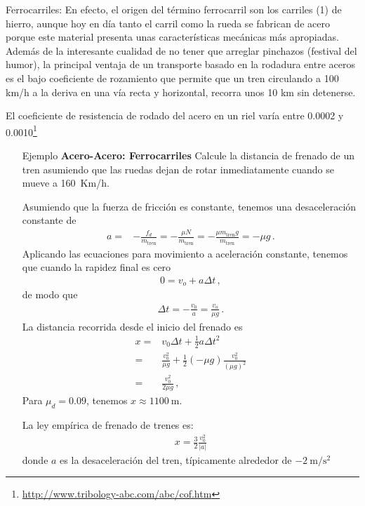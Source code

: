 \begin{frame}
  \begin{block}%
{Ferrocarriles:} En efecto, el origen del término ferrocarril son los carriles (1) de hierro, aunque hoy en día tanto el carril como la rueda se fabrican de acero porque este material presenta unas características mecánicas más apropiadas. Además de la interesante cualidad de no tener que arreglar pinchazos (festival del humor), la principal ventaja de un transporte basado en la rodadura entre aceros es el bajo coeficiente de rozamiento que permite que un tren circulando a 100 km/h a la deriva en una vía recta y horizontal, recorra unos 10 km sin detenerse. 
  \end{block}
El coeficiente de resistencia de rodado del acero en un riel varía entre 0.0002 y 0.0010\footnote{\url{http://www.tribology-abc.com/abc/cof.htm}} 
\end{frame}



\begin{itemize}
\item[Ejemplo] \textbf{Acero-Acero: Ferrocarriles} Calcule la distancia de frenado de un tren asumiendo que las ruedas dejan de rotar inmediatamente cuando se mueve a 160~Km/h.

Asumiendo que la fuerza de fricción es constante, tenemos una desaceleración constante de
\begin{align}
  a=&-\frac{f_d}{m_{\text{tren}}}=-\frac{\mu N}{m_{\text{tren}}}=-\frac{\mu m_{\text{tren}} g}{m_{\text{tren}}}=
-\mu g\,.
\end{align}
Aplicando las ecuaciones para movimiento a aceleración constante, tenemos que cuando la rapidez final es cero
\begin{align}
  0=v_o+a\Delta t\,,
\end{align}
de modo que
\begin{align}
  \Delta t = -\frac{v_0}{a}=\frac{v_o}{\mu g}\,.
\end{align}
La distancia recorrida desde el inicio del frenado es
\begin{align}
  x=&v_0 \Delta t +\frac{1}{2}a \Delta t^2\nonumber\\
  =&\frac{v_0^2}{\mu g}+\frac{1}{2}(-\mu g)\frac{v_0^2}{(\mu g)^2}\nonumber\\
 =&\frac{v_0^2}{2\mu g}\,,
\end{align}
Para $\mu_d=0.09$, tenemos $x\approx 1100\ $m.

La ley empírica de frenado de trenes es:
\begin{align}
  x=\frac{3}{2}\frac{v_0^2}{|a|}
\end{align}
donde $a$ es la desaceleración del tren, típicamente alrededor de $-2\ \text{m}/\text{s}^2$
\end{itemize}


